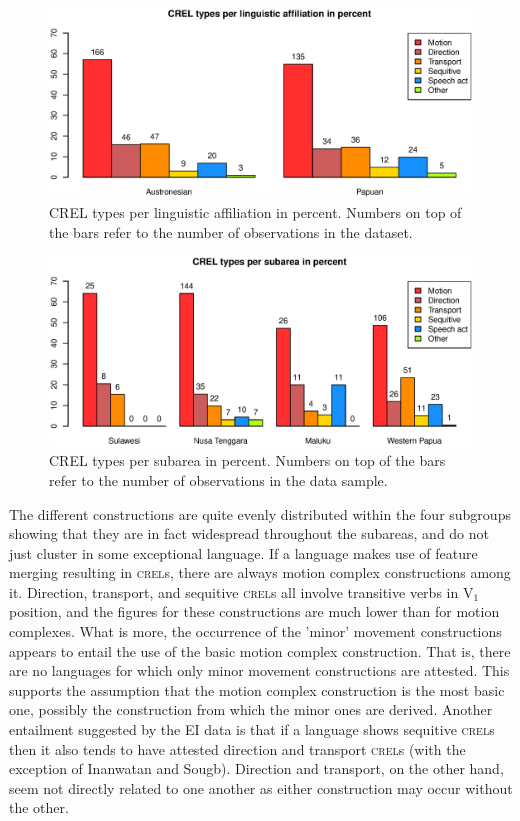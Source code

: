\begin{figure}
\includegraphics[width=\columnwidth]{figures/CREL_Family.eps}
\caption[CREL types per linguistic affiliation in percent]{CREL types per linguistic affiliation in percent. Numbers on top of the bars refer to the number of observations in the dataset.}\label{fig:crel-family}
\end{figure}
\begin{figure}
\includegraphics[width=\columnwidth]{figures/CREL_Group.eps}
\caption[CREL types per subarea in percent]{CREL types per subarea in percent. Numbers on top of the bars refer to the number of observations in the data sample.}\label{fig:crel-group}
\end{figure}


The different constructions are quite evenly distributed within the four subgroups showing that they are in fact widespread throughout the subareas, and do not just cluster in some exceptional language. If a language makes use of feature merging resulting in \textsc{crel}s, there are always motion complex constructions among it. Direction, transport, and sequitive \textsc{crel}s all involve transitive verbs in V$_1$ position, and the figures for these constructions are much lower than for motion complexes. What is more, the occurrence of the 'minor' movement constructions appears to entail the use of the basic motion complex construction. That is, there are no languages for which only minor movement constructions are attested. This supports the assumption that the motion complex construction is the most basic one, possibly the construction from which the minor ones are derived. Another entailment suggested by the EI data is that if a language shows sequitive \textsc{crel}s then it also tends to have attested direction and transport \textsc{crel}s (with the exception of Inanwatan and Sougb). Direction and transport, on the other hand, seem not directly related to one another as either construction may occur without the other.

